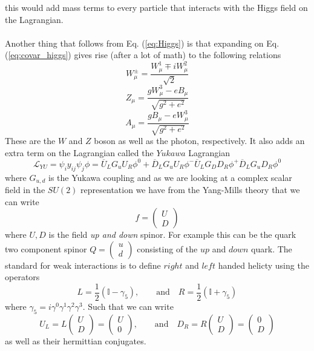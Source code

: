 \documentclass[12pt, a4paper]{book}
\begin{document}
this would add mass terms to every particle that interacts with the Higgs field on the Lagrangian.\\
\\Another thing that follows from Eq. (\ref{eq:Higgs}) is that expanding on Eq. (\ref{eq:covar_higgs}) gives rise (after a lot of math) to the following relations
\begin{equation}\label{eq:W_boson}
    W_\mu^\pm = \frac{W_\mu^1 \mp iW_\mu^2}{\sqrt{2}}
\end{equation}
\begin{equation}\label{eq:Z_boson}
    Z_\mu = \frac{gW_\mu^3 - eB_\mu}{\sqrt{g^2+e^2}}
\end{equation}
\begin{equation}\label{eq:photon}
    A_\mu = \frac{gB_\mu - eW_\mu^3}{\sqrt{g^2+e^2}}
\end{equation}
These are the $W$ and $Z$ boson as well as the photon, respectively. It also adds an extra term on the Lagrangian called the $Yukawa$ Lagrangian
$$
\mathcal{L}_{YU} = \psi_i y_{ij}\psi_j\phi = \overline{U}_L G_u U_R \phi^0 + \overline{D}_L G_u U_R \phi^- \overline{U}_L G_D D_R \phi^+ \overline{D}_L G_u D_R \phi^0
$$
where $G_{u,d}$ is the Yukawa coupling and as we are looking at a complex scalar field in the $SU(2)$ representation we have from the Yang-Mills theory that we can write
$$
f=\begin{pmatrix}
    U\\D
\end{pmatrix}
$$
where $U,D$ is the field \textit{up and down} spinor. For example this can be the quark two component spinor $Q = \begin{pmatrix}
    u\\ d
\end{pmatrix}$ consisting of the $up$ and $down$ quark. The standard for weak interactions is to define $right$ and $left$ handed helicty using the operators 
$$
L = \frac{1}{2}(\mathbb{I} - \gamma_5),\qquad\text{and}\quad R = \frac{1}{2}(\mathbb{I} + \gamma_5)
$$
where $\gamma_{5}=i\gamma^0\gamma^1\gamma^2\gamma^3$. Such that we can write 
$$
U_L = L\begin{pmatrix}
    U\\D
\end{pmatrix} = \begin{pmatrix}
    U\\0
\end{pmatrix},\qquad\text{and}\quad D_R = R\begin{pmatrix}
    U\\D
\end{pmatrix} = \begin{pmatrix}
    0\\D
\end{pmatrix}
$$
as well as their hermittian conjugates. 
\end{document}
